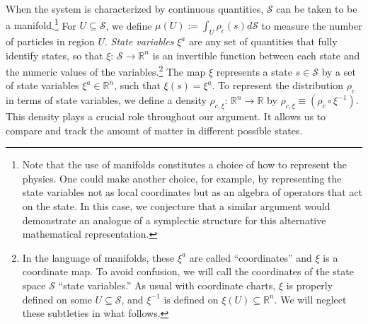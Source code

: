\documentclass[12pt, twoside]{article}
\begin{document}


When the system is characterized by continuous quantities, {\color{green}$\mathcal{S}$ can be taken to be a manifold}.\footnote{{\color{green}Note that the use of manifolds constitutes a choice of how to represent the physics. One could make another choice, for example, by representing the state variables not as local coordinates but as an algebra of operators that act on the state. In this case, we conjecture that a similar argument would demonstrate an analogue of a symplectic structure for this alternative mathematical representation.}} For $U \subseteq \mathcal{S}$, we define $\mu(U) := \int_U \rho_c(s) d\mathcal{S}$ to measure the number of particles in region $U$. \textit{State variables} $\xi^a$ are any set of quantities that fully identify states, so that $\xi$: $\mathcal{S} \to \mathbb{R}^n$ is an invertible function between each state and the numeric values of the variables.\footnote{In the language of manifolds, these $\xi^a$ are called ``coordinates'' and $\xi$ is a coordinate map. To avoid confusion, we will call the coordinates of the state space $\mathcal{S}$ ``state variables.'' As usual with coordinate charts, $\xi$ is properly defined on some $U \subseteq \mathcal{S}$, and $\xi^{-1}$ is defined on $\xi(U) \subseteq \mathbb{R}^n$. We will neglect these subtleties in what follows.} The map $\xi$ represents a state $s \in \mathcal{S}$ by a set of state variables $\xi^a \in \mathbb{R}^n$, such that $\xi (s) = \xi^a$. To represent the distribution $\rho_c$ in terms of state variables, we define a density $\rho_{c, \xi}$: $\mathbb{R}^n \to \mathbb{R}$ by $\rho_{c, \xi} \equiv (\rho_c \circ \xi^{-1})$. This density plays a crucial role throughout our argument. It allows us to compare and track the amount of matter in different possible states.
\end{document}
